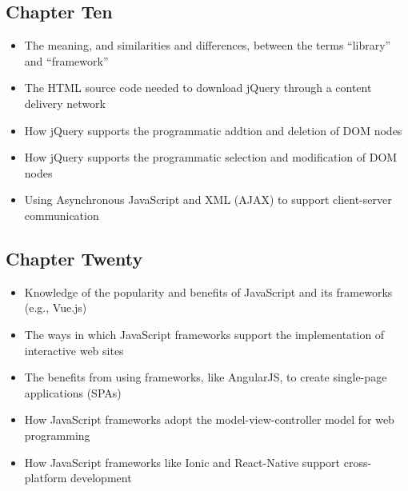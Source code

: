 \documentclass[11pt]{article}
\begin{document}
\vspace*{-.2in}
\subsection*{Chapter Ten}

\begin{itemize}

  \itemsep 0.05in

  \item The meaning, and similarities and differences, between the terms
    ``library'' and ``framework''

  \item The HTML source code needed to download jQuery through a content
    delivery network

  \item How jQuery supports the programmatic addtion and deletion of DOM
    nodes

  \item How jQuery supports the programmatic selection and modification of DOM
    nodes

  \item Using Asynchronous JavaScript and XML (AJAX) to support client-server
    communication

\end{itemize}

\vspace*{-.2in}
\subsection*{Chapter Twenty}

\begin{itemize}

  \item Knowledge of the popularity and benefits of JavaScript and its
    frameworks (e.g., Vue.js)

  \item The ways in which JavaScript frameworks support the implementation of
    interactive web sites

  \item The benefits from using frameworks, like AngularJS, to create single-page
    applications (SPAs)

  \item How JavaScript frameworks adopt the model-view-controller model for
    web programming

  \item How JavaScript frameworks like Ionic and React-Native support
    cross-platform development

\end{itemize}
\end{document}

